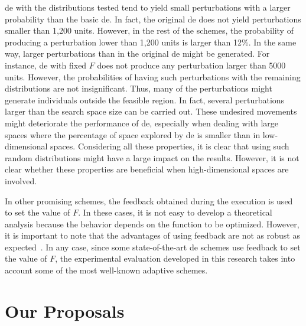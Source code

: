 \documentclass[preprint,3p]{elsarticle}
\newcommand{\DE}{{\sc de}}
\begin{document}
\DE{} with the distributions tested tend to yield small perturbations with a larger probability than the basic \DE{}.
%
In fact, the original \DE{} does not yield perturbations smaller than 1,200 units.
%
However, in the rest of the schemes, the probability of producing a perturbation lower than 1,200 units is larger than 12\%.
%
In the same way, larger perturbations than in the original \DE{} might be generated.
%
For instance, \DE{} with fixed $F$ does not produce any perturbation larger than 5000 units.
%
However, the probabilities of having such perturbations with the remaining distributions are not insignificant.
%
Thus, many of the perturbations might generate individuals outside the feasible region.
%
In fact, several perturbations larger than the search space size can be carried out.
%
These undesired movements might deteriorate the performance of \DE{}, especially when dealing with large spaces where the
percentage of space explored by \DE{} is smaller than in low-dimensional spaces.
%
Considering all these properties, it is clear that using such random distributions might have a large impact on the results.
%
However, it is not clear whether these properties are beneficial when high-dimensional spaces are involved.

In other promising schemes, the feedback obtained during the execution is used to set the value of $F$.
%
In these cases, it is not easy to develop a theoretical analysis because the behavior depends on the function to be optimized.
%
However, it is important to note that the advantages of using feedback are not as robust as expected~\cite{Zielinski:08,Segura:14}.
%
In any case, since some state-of-the-art \DE{} schemes use feedback to set the value of $F$,
the experimental evaluation developed in this research takes into account some of the most well-known adaptive schemes.

\section{Our Proposals}
\label{sec:proposal}
\end{document}
